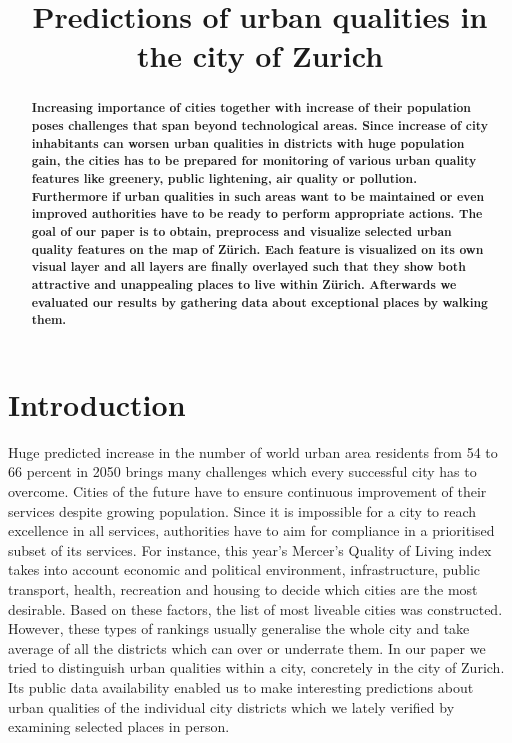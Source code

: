 \documentclass[letterpaper]{article}
\title{Predictions of urban qualities in the city of Zurich}
\begin{document}
%
\maketitle
%

\begin{abstract}
\textbf{
Increasing importance of cities together with increase of their population poses challenges that span beyond
technological areas. Since increase of city inhabitants can worsen urban qualities in districts with huge 
population gain, the cities has to be prepared for monitoring of various urban quality features like greenery,
public lightening, air quality or pollution. Furthermore if urban qualities in such areas want to be maintained or
even improved authorities have to be ready to perform appropriate actions. The goal of our paper is to obtain,
preprocess and visualize selected urban quality features on the map of Zürich. Each feature is visualized
on its own visual layer and all layers are finally overlayed such that they show both attractive and unappealing 
places to live within Zürich. Afterwards we evaluated our results by gathering data about exceptional places 
by walking them.
}
\end{abstract}

\section{Introduction}\label{sec:intro}
Huge predicted increase in the number of world urban area residents from 54 to 66 percent in 2050 brings many challenges
which every successful city has to overcome. Cities of the future have to ensure continuous improvement of their
services despite growing population. Since it is impossible for a city to reach excellence in all services,
authorities have to aim for compliance in a prioritised subset of its services. For instance, this year's Mercer's Quality of Living index\cite{mercer}
takes into account economic and political environment, infrastructure, public transport, health, recreation and housing
to decide which cities are the most desirable. Based on these factors, the list of most liveable cities was constructed.
However, these types of rankings usually generalise the whole city and take average of all the districts which can
over or underrate them. In our paper we tried to distinguish urban qualities within a city, concretely in the city of Zurich.
Its public data availability enabled us to make interesting predictions about urban qualities of the individual city districts
which we lately verified by examining selected places in person.
\end{document}
